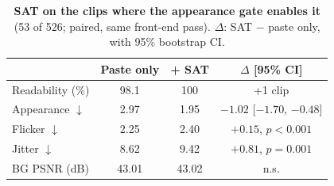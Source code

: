 \begin{table}[t]
\centering
\caption{\textbf{SAT on the clips where the appearance gate enables it} (53 of 526; paired, same front-end pass). $\Delta$: SAT $-$ paste only, with 95\% bootstrap CI.}
\label{tab:sat}
\small\setlength{\tabcolsep}{3pt}
\begin{tabular}{@{}lccc@{}}
\toprule
 & Paste only & + SAT & $\Delta$ [95\% CI] \\
\midrule
Readability (\%) & 98.1 & 100 & +1 clip \\
Appearance $\downarrow$ & 2.97 & 1.95 & $-1.02$ [$-1.70$, $-0.48$] \\
Flicker $\downarrow$ & 2.25 & 2.40 & $+0.15$, $p<0.001$ \\
Jitter $\downarrow$ & 8.62 & 9.42 & $+0.81$, $p=0.001$ \\
BG PSNR (dB) & 43.01 & 43.02 & n.s. \\
\bottomrule
\end{tabular}
\end{table}
